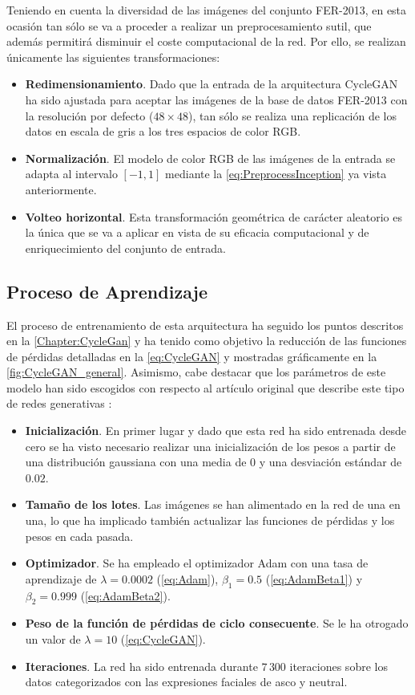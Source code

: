 Teniendo en cuenta la diversidad de las imágenes del conjunto FER-2013, en esta ocasión tan sólo se va a proceder a realizar un preprocesamiento sutil, que además permitirá disminuir el coste computacional de la red. Por ello, se realizan únicamente las siguientes transformaciones:
\begin{itemize}
    \item \textbf{Redimensionamiento}. Dado que la entrada de la arquitectura CycleGAN ha sido ajustada para aceptar las imágenes de la base de datos FER-2013 con la resolución por defecto ($48 \times 48$), tan sólo se realiza una replicación de los datos en escala de gris a los tres espacios de color RGB.
    \item \textbf{Normalización}. El modelo de color RGB de las imágenes de la entrada se adapta al intervalo $[-1, 1]$ mediante la \autoref{eq:PreprocessInception} ya vista anteriormente.
    \item \textbf{Volteo horizontal}. Esta transformación geométrica de carácter aleatorio es la única que se va a aplicar en vista de su eficacia computacional y de enriquecimiento del conjunto de entrada.
\end{itemize}

\subsection{Proceso de Aprendizaje}

El proceso de entrenamiento de esta arquitectura ha seguido los puntos descritos en la \autoref{Chapter:CycleGan} y ha tenido como objetivo la reducción de las funciones de pérdidas detalladas en la \autoref{eq:CycleGAN} y mostradas gráficamente en la \autoref{fig:CycleGAN_general}. Asimismo, cabe destacar que los parámetros de este modelo han sido escogidos con respecto al artículo original que describe este tipo de redes generativas \cite{cycleGAN}:
\begin{itemize}
    \item \textbf{Inicialización}. En primer lugar y dado que esta red ha sido entrenada desde cero se ha visto necesario realizar una inicialización de los pesos a partir de una distribución gaussiana con una media de $0$ y una desviación estándar de $0.02$. 
    \item \textbf{Tamaño de los lotes}. Las imágenes se han alimentado en la red de una en una, lo que ha implicado también actualizar las funciones de pérdidas y los pesos en cada pasada.
    \item \textbf{Optimizador}. Se ha empleado el optimizador Adam con una tasa de aprendizaje de $ \lambda = 0.0002$ (\autoref{eq:Adam}), $\beta_1 = 0.5$ (\autoref{eq:AdamBeta1}) y $\beta_2 = 0.999$ (\autoref{eq:AdamBeta2}).
    \item \textbf{Peso de la función de pérdidas de ciclo consecuente}. Se le ha otrogado un valor de $\lambda = 10$ (\autoref{eq:CycleGAN}).
    \item \textbf{Iteraciones}. La red ha sido entrenada durante $7\,300$ iteraciones sobre los datos categorizados con las expresiones faciales de asco y neutral.
\end{itemize}

